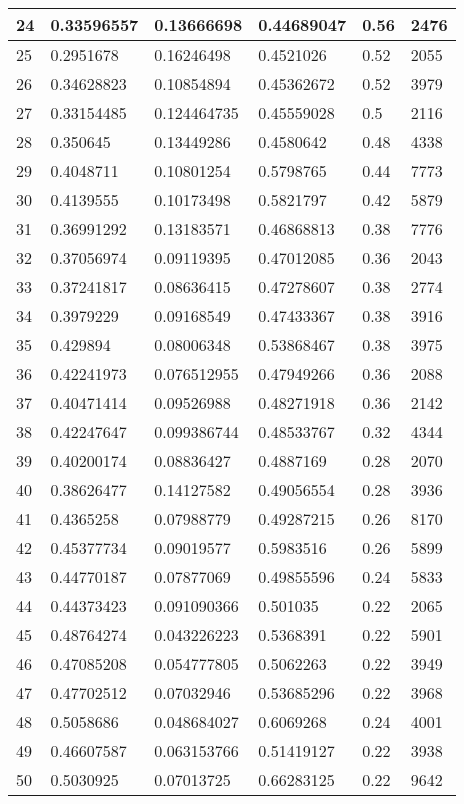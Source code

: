 \begin{longtable}{|l|l|l|l|l|l|}
24 & 0.33596557 & 0.13666698 & 0.44689047 & 0.56 & 2476 \\ \hline 
25 & 0.2951678 & 0.16246498 & 0.4521026 & 0.52 & 2055 \\ \hline 
26 & 0.34628823 & 0.10854894 & 0.45362672 & 0.52 & 3979 \\ \hline 
27 & 0.33154485 & 0.124464735 & 0.45559028 & 0.5 & 2116 \\ \hline 
28 & 0.350645 & 0.13449286 & 0.4580642 & 0.48 & 4338 \\ \hline 
29 & 0.4048711 & 0.10801254 & 0.5798765 & 0.44 & 7773 \\ \hline 
30 & 0.4139555 & 0.10173498 & 0.5821797 & 0.42 & 5879 \\ \hline 
31 & 0.36991292 & 0.13183571 & 0.46868813 & 0.38 & 7776 \\ \hline 
32 & 0.37056974 & 0.09119395 & 0.47012085 & 0.36 & 2043 \\ \hline 
33 & 0.37241817 & 0.08636415 & 0.47278607 & 0.38 & 2774 \\ \hline 
34 & 0.3979229 & 0.09168549 & 0.47433367 & 0.38 & 3916 \\ \hline 
35 & 0.429894 & 0.08006348 & 0.53868467 & 0.38 & 3975 \\ \hline 
36 & 0.42241973 & 0.076512955 & 0.47949266 & 0.36 & 2088 \\ \hline 
37 & 0.40471414 & 0.09526988 & 0.48271918 & 0.36 & 2142 \\ \hline 
38 & 0.42247647 & 0.099386744 & 0.48533767 & 0.32 & 4344 \\ \hline 
39 & 0.40200174 & 0.08836427 & 0.4887169 & 0.28 & 2070 \\ \hline 
40 & 0.38626477 & 0.14127582 & 0.49056554 & 0.28 & 3936 \\ \hline 
41 & 0.4365258 & 0.07988779 & 0.49287215 & 0.26 & 8170 \\ \hline 
42 & 0.45377734 & 0.09019577 & 0.5983516 & 0.26 & 5899 \\ \hline 
43 & 0.44770187 & 0.07877069 & 0.49855596 & 0.24 & 5833 \\ \hline 
44 & 0.44373423 & 0.091090366 & 0.501035 & 0.22 & 2065 \\ \hline 
45 & 0.48764274 & 0.043226223 & 0.5368391 & 0.22 & 5901 \\ \hline 
46 & 0.47085208 & 0.054777805 & 0.5062263 & 0.22 & 3949 \\ \hline 
47 & 0.47702512 & 0.07032946 & 0.53685296 & 0.22 & 3968 \\ \hline 
48 & 0.5058686 & 0.048684027 & 0.6069268 & 0.24 & 4001 \\ \hline 
49 & 0.46607587 & 0.063153766 & 0.51419127 & 0.22 & 3938 \\ \hline 
50 & 0.5030925 & 0.07013725 & 0.66283125 & 0.22 & 9642 \\ \hline 
\end{longtable}